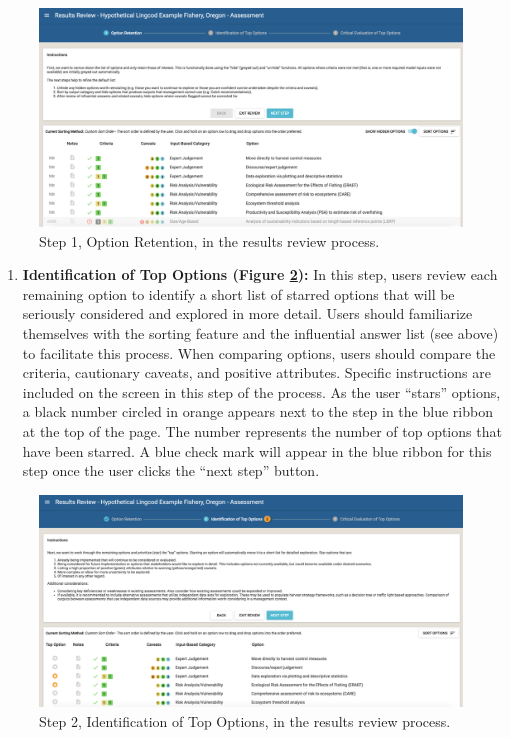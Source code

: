 \documentclass[
  11pt,
]{book}
\providecommand{\tightlist}{%
  \setlength{\itemsep}{0pt}\setlength{\parskip}{0pt}}
\begin{document}
\begin{figure}

{\centering \includegraphics[width=0.95\linewidth]{images/review-step-1} 

}

\caption{Step 1, Option Retention, in the results review process.}\label{fig:review-step-1}
\end{figure}

\begin{enumerate}
\def\labelenumi{\arabic{enumi}.}
\setcounter{enumi}{1}
\tightlist
\item
  \textbf{Identification of Top Options (Figure \ref{fig:review-step-2}):} In this step, users review each remaining option to identify a short list of starred options that will be seriously considered and explored in more detail. Users should familiarize themselves with the sorting feature and the influential answer list (see above) to facilitate this process. When comparing options, users should compare the criteria, cautionary caveats, and positive attributes. Specific instructions are included on the screen in this step of the process. As the user ``stars'' options, a black number circled in orange appears next to the step in the blue ribbon at the top of the page. The number represents the number of top options that have been starred. A blue check mark will appear in the blue ribbon for this step once the user clicks the ``next step'' button.
\end{enumerate}

\begin{figure}

{\centering \includegraphics[width=0.95\linewidth]{images/review-step-2} 

}

\caption{Step 2, Identification of Top Options, in the results review process.}\label{fig:review-step-2}
\end{figure}
\end{document}
